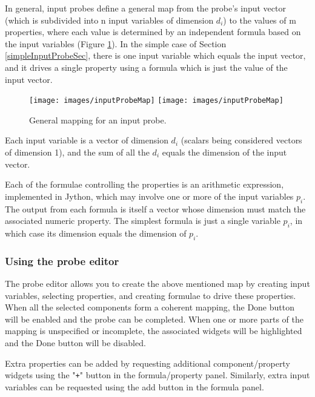 \documentclass{article}
\begin{document}
In general, input probes define a general map from the probe's
input vector (which is subdivided into n input variables
of dimension $d_i$) to the values of m properties, where each
value is determined by an independent formula based
on the input variables (Figure \ref{InputProbeMapFig}).
In the simple case of Section \ref{simpleInputProbeSec},
there is one input variable which equals the input vector,
and it drives a single property using a formula which is
just the value of the input vector.

\begin{figure}
\begin{center}
\iflatexml
\texttt{[image: images/inputProbeMap]}
\else
\texttt{[image: images/inputProbeMap]}
\fi
\end{center}
\caption{General mapping for an input probe.}%
\label{InputProbeMapFig}
\end{figure}

Each input variable is a vector of dimension $d_i$ (scalars being
considered vectors of dimension 1), and the sum of all the $d_i$ equals
the dimension of the input vector.

Each of the formulae controlling the properties is an arithmetic
expression, implemented in Jython, which may involve one or more of
the input variables $p_i$. The output from each formula is itself a vector
whose dimension must match the associated numeric property.
The simplest formula is just a single variable $p_i$, in which
case its dimension equals the dimension of $p_i$.

\subsubsection{Using the probe editor}

The probe editor allows you to create the above mentioned
map by creating input variables, selecting properties,
and creating formulae to drive these properties. When all the
selected components form a coherent mapping, the {\sf Done} button will be
enabled and the probe can be completed. When one or more parts of the
mapping is unspecified or incomplete, the associated widgets will be
highlighted and the {\sf Done} button will be disabled.

Extra properties can be added by requesting additional
component/property widgets using the "{\tt +}" button in the
formula/property panel. Similarly, extra input variables can be
requested using the add button in the formula panel.
\end{document}
